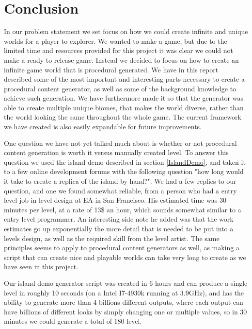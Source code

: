 \chapter{Conclusion}
\label{cha:Conclusion}
In our problem statement we set focus on how we could create infinite and unique worlds for a player to explorer. We wanted to make a game, but due to the limited time and resources provided for this project it was clear we could not make a ready to release game. Instead we decided to focus on how to create an infinite game world that is procedural generated. We have in this report described some of the most important and interesting parts necessary to create a procedural content generator, as well as some of the background knowledge to achieve such generation. We have furthermore made it so that the generator was able to create multiple unique biomes, that makes the world diverse, rather than the world looking the same throughout the whole game. The current framework we have created is also easily expandable for future improvements.

One question we have not yet talked much about is whether or not procedural content generation is worth it versus manually created level. To answer this question we used the island demo described in section \ref{IslandDemo}, and taken it to a few online development forums with the following question "how long would it take to create a replica of the island by hand?". We had a few replies to our question, and one we found somewhat reliable, from a person who had a entry level job in level design at EA in San Francisco. His estimated time was 30 minutes per level, at a rate of 13\$ an hour, which sounds somewhat similar to a entry level programmer. An interesting side note he added was that the work estimates go up exponentially the more detail that is needed to be put into a levels design, as well as the required skill from the level artist. The same principles seems to apply to procedural content generators as well, as making a script that can create nice and playable worlds can take very long to create as we have seen in this project.

Our island demo generator script was created in 6 hours and can produce a single level in roughly 10 seconds (on a Intel I7-4930k running at 3.9GHz), and has the ability to generate more than 4 billions different outputs, where each output can have billions of different looks by simply changing one or multiple values, so in 30 minutes we could generate a total of 180 level. 

